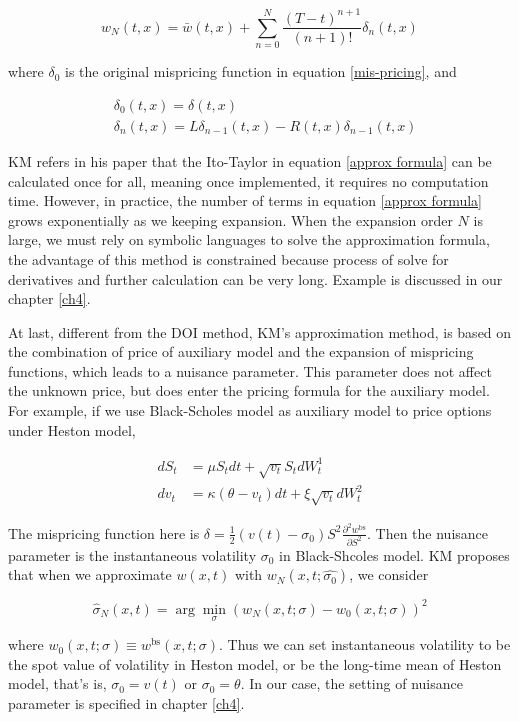 \begin{equation}\label{approx formula}
    w_{N}(t, x)=\bar{w}(t,x)+\sum_{n=0}^{N} \frac{(T-t)^{n+1}}{(n+1) !} \delta_{n}(t, x)
\end{equation}

\noindent where $\delta_0$ is the original mispricing function in equation \eqref{mis-pricing}, and

\begin{equation}
    \begin{aligned}
        &\delta_0(t,x) = \delta(t,x) \\
        &\delta_{n}(t, x)=L \delta_{n-1}(t, x)-R(t, x) \delta_{n-1}(t, x)
        \end{aligned}
\end{equation}

KM refers in his paper that the Ito-Taylor in equation \eqref{approx formula} can be calculated once for all, meaning once implemented, it requires no computation time. However, in practice, the number of terms in equation \eqref{approx formula} grows exponentially as we keeping expansion. When the expansion order $N$ is large, we must rely on symbolic languages to solve the approximation formula, the advantage of this method is constrained because process of solve for derivatives and further calculation can be very long. Example is discussed in our chapter \ref{ch4}.

At last, different from the DOI method, KM's approximation method, is based on the combination of price of auxiliary model and the expansion of mispricing functions, which leads to a nuisance parameter. This parameter does not affect the unknown price, but does enter the pricing formula for the auxiliary model. For example, if we use Black-Scholes model as auxiliary model to price options under Heston model, 

$$
\begin{aligned}
    d S_{t}&=\mu S_{t} d t+\sqrt{v_{t}} S_{t} d W_{t}^{1} \\
    d v_{t}&=\kappa\left(\theta-v_{t}\right) d t+\xi \sqrt{v_{t}} d W_{t}^{2}
\end{aligned}
$$

\noindent The mispricing function here is $\delta = \frac{1}{2}(v(t)-\sigma_0)S^2 \frac{\partial^2 w^{\text{bs}}}{\partial S^2}. $ Then the nuisance parameter is the instantaneous volatility $\sigma_0$ in Black-Shcoles model. KM proposes that when we approximate $w(x,t)$ with $w_N(x,t;\hat{\sigma_0})$, we consider

$$
\hat{\sigma}_{N}(x, t)=\arg \min _{\sigma}\left(w_{N}(x, t ; \sigma)-w_{0}(x, t ; \sigma)\right)^{2}
$$

\noindent where $w_{0}(x, t ; \sigma)\equiv w^{\text{bs}}(x, t ; \sigma)$. Thus we can set instantaneous volatility to be the spot value of volatility in Heston model, or be the long-time mean of Heston model, that's is, $\sigma_0 = v(t)$ or $\sigma_0 = \theta$. In our case, the setting of nuisance parameter is specified in chapter \ref{ch4}.